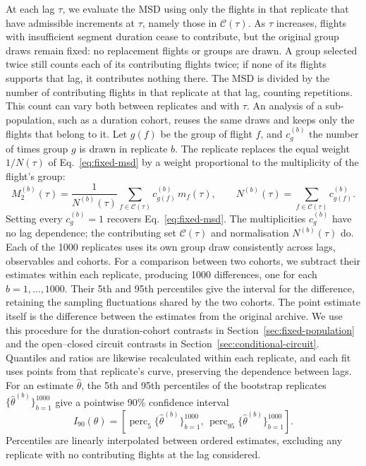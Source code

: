 At each lag $\tau$, we evaluate the MSD using only the flights in that replicate
that have admissible increments at $\tau$, namely those in $\mathcal C(\tau)$.
As $\tau$ increases, flights with insufficient segment duration cease to contribute,
but the original group draws remain fixed: no replacement flights or groups are
drawn. A group selected twice still counts each of its contributing flights twice;
if none of its flights supports that lag, it contributes nothing there.
The MSD is divided by the number of contributing flights in that replicate at that
lag, counting repetitions. This count can vary both between replicates and with
$\tau$.
An analysis of a sub-population, such as a duration cohort, reuses the same draws
and keeps only the flights that belong to it.
Let $g(f)$ be the group of flight $f$, and $c^{(b)}_g$ the number of times group $g$ is
drawn in replicate $b$. The replicate replaces the equal weight $1/N(\tau)$ of
Eq.~\eqref{eq:fixed-msd} by a weight proportional to the multiplicity of the flight's
group:
\begin{equation}
 M_2^{(b)}(\tau)=\frac{1}{N^{(b)}(\tau)}
 \sum_{f\in\mathcal C(\tau)}c^{(b)}_{g(f)}\,m_f(\tau),
 \qquad
 N^{(b)}(\tau)=\sum_{f\in\mathcal C(\tau)}c^{(b)}_{g(f)}.
 \label{eq:fixed-bootstrap}
\end{equation}
Setting every $c^{(b)}_g=1$ recovers Eq.~\eqref{eq:fixed-msd}. The multiplicities
$c^{(b)}_g$ have no lag dependence; the contributing set $\mathcal C(\tau)$ and
normalisation $N^{(b)}(\tau)$ do. Each of the 1000 replicates uses its own group draw
consistently across lags, observables and cohorts. For a comparison between two
cohorts, we subtract their estimates within each replicate, producing 1000
differences, one for each $b=1,\ldots,1000$. Their 5th and 95th percentiles give the
interval for the difference, retaining the sampling fluctuations shared by the
two cohorts. The point estimate itself is the difference between the estimates
from the original archive. We use this procedure for the duration-cohort contrasts
in Section~\ref{sec:fixed-population} and the open--closed circuit contrasts in
Section~\ref{sec:conditional-circuit}.
Quantiles and ratios are likewise recalculated within each replicate, and each fit
uses points from that replicate's curve, preserving the dependence between lags.
For an estimate $\widehat\theta$,
the 5th and 95th percentiles of the bootstrap replicates $\{\widehat\theta^{(b)}\}_{b=1}^{1000}$ give a pointwise 90\% confidence interval
\begin{equation}
 I_{90}(\theta)=
 \left[\operatorname{perc}_{5}\{\widehat\theta^{(b)}\}_{b=1}^{1000},\,
       \operatorname{perc}_{95}\{\widehat\theta^{(b)}\}_{b=1}^{1000}\right].
 \label{eq:fixed-ci}
\end{equation}
Percentiles are linearly interpolated between ordered estimates, excluding any
replicate with no contributing flights at the lag considered.\\\\

